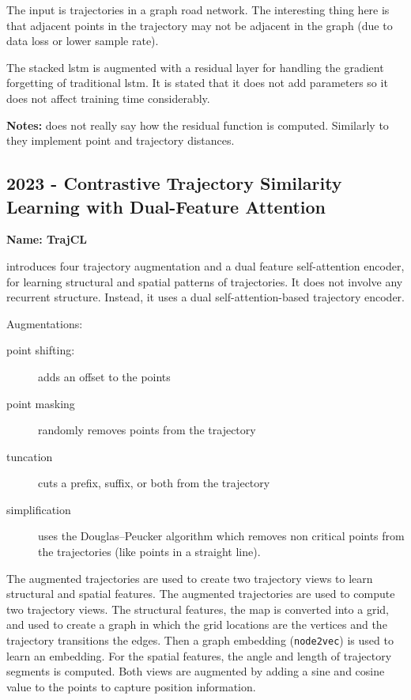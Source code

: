 The input is trajectories in a graph road network. The interesting thing here is that adjacent points in the trajectory may not be adjacent in the graph (due to data loss or lower sample rate).

The stacked \gls{lstm} is augmented with a residual layer for handling the gradient forgetting of traditional \gls{lstm}. It is stated that it does not add parameters so it does not affect training time considerably.

\textbf{Notes:} does not really say how the residual function is computed. Similarly to \cite{han2021graph} they implement point and trajectory distances. 

\subsection*{2023 - Contrastive Trajectory Similarity Learning with Dual-Feature Attention}

\textbf{Name: TrajCL}

\cite{chang2023contrastive} introduces four trajectory augmentation and a dual feature self-attention encoder, for learning structural and spatial patterns of trajectories. It does not involve any recurrent structure. Instead, it uses a dual self-attention-based trajectory encoder.

Augmentations:
\begin{description}
	\item[point shifting:] adds an offset to the points
	\item[point masking] randomly removes points from the trajectory
	\item[tuncation] cuts a prefix, suffix, or both from the trajectory
	\item[simplification] uses the Douglas–Peucker algorithm which removes non critical points from the trajectories (like points in a straight line).
\end{description}

The augmented trajectories are used to create two trajectory views to learn structural and spatial features. The augmented trajectories are used to compute two trajectory views.
%
The structural features, the map is converted into a grid, and used to create a graph in which the grid locations are the vertices and the trajectory transitions the edges. Then a graph embedding (\texttt{node2vec}) is used to learn an embedding.
%
For the spatial features, the angle and length of trajectory segments is computed.
%
Both views are augmented by adding a  sine and cosine value to the points to capture position information.

